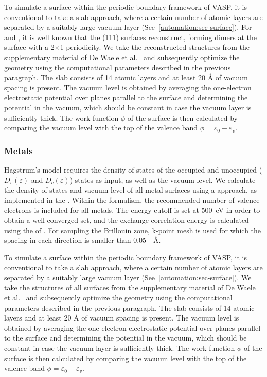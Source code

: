 \begin{refsection}
To simulate a surface within the periodic boundary framework of VASP, it is 
conventional to take a slab approach, where a certain number of atomic layers 
are separated by a suitably large vacuum layer 
(See~\ref{automation:sec-surface}). For  and , it is 
well known that the (111) surfaces reconstruct, forming dimers at the surface 
with a 2$\times$1 periodicity. We take the reconstructed structures from the 
supplementary material of De Waele et al.~\cite{DeWaele2016} and subsequently 
optimize the geometry using the computational parameters described in the 
previous paragraph. The slab consists of 14 atomic layers and at least 20 
\si{\angstrom} of vacuum spacing is present. The vacuum level is obtained by 
averaging the one-electron electrostatic potential over planes parallel to the 
surface and determining the potential in the vacuum, which should be constant 
in case the vacuum layer is sufficiently thick. The work function $\phi$ of 
the surface is then calculated by comparing the vacuum level with the top of 
the valence band $\phi = \varepsilon_0 - \varepsilon_v$.

\subsubsection{Metals} \label{appendix:sec-metals} 

Hagstrum's model requires the density of states of the occupied and unoccupied 
($D_v(\varepsilon)$ and $D_c(\varepsilon)$) states as input, as well as 
the vacuum level. We calculate the density of states and vacuum level of 
all metal surfaces using a  approach, as implemented in the 
. Within the  formalism, the recommended number of valence 
electrons is included for all metals. The energy cutoff is set at 
500~\si{\electronvolt} in order to obtain a well converged  
set, and the exchange correlation energy is calculated using the  
of . For sampling the Brillouin zone,  k-point mesh is used 
for which the spacing in each direction is smaller than 0.05~\si{\per\angstrom}.

To simulate a surface within the periodic boundary framework of VASP, it is 
conventional to take a slab approach, where a certain number of atomic layers 
are separated by a suitably large vacuum layer (See~\ref{automation:sec-surface}).
We take the structures of all surfaces from the 
supplementary material of De Waele et al.~\cite{DeWaele2016} and subsequently 
optimize the geometry using the computational parameters described in the 
previous paragraph. The slab consists of 14 atomic layers and at least 20 
\si{\angstrom} of vacuum spacing is present. The vacuum level is obtained by 
averaging the one-electron electrostatic potential over planes parallel to the 
surface and determining the potential in the vacuum, which should be constant 
in case the vacuum layer is sufficiently thick. The work function $\phi$ of 
the surface is then calculated by comparing the vacuum level with the top of 
the valence band $\phi = \varepsilon_0 - \varepsilon_v$. 


\end{refsection}
